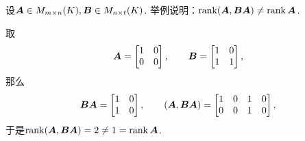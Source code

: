 \begin{example}
设\(\boldsymbol{A} \in M_{m \times n}(K),
\boldsymbol{B} \in M_{n \times t}(K)\).
举例说明：\(\rank(\boldsymbol{A},\boldsymbol{B} \boldsymbol{A}) \neq \rank\boldsymbol{A}\).
\begin{solution}
取\begin{equation*}
	\boldsymbol{A} = \begin{bmatrix}
		1 & 0 \\
		0 & 0
	\end{bmatrix},
	\qquad
	\boldsymbol{B} = \begin{bmatrix}
		1 & 0 \\
		1 & 1
	\end{bmatrix},
\end{equation*}
那么\begin{equation*}
	\boldsymbol{B} \boldsymbol{A} = \begin{bmatrix}
		1 & 0 \\
		1 & 0
	\end{bmatrix},
	\qquad
	(\boldsymbol{A},\boldsymbol{B} \boldsymbol{A}) = \begin{bmatrix}
		1 & 0 & 1 & 0 \\
		0 & 0 & 1 & 0
	\end{bmatrix},
\end{equation*}
于是\(\rank(\boldsymbol{A},\boldsymbol{B} \boldsymbol{A}) = 2 \neq 1 = \rank\boldsymbol{A}\).
\end{solution}
\end{example}
